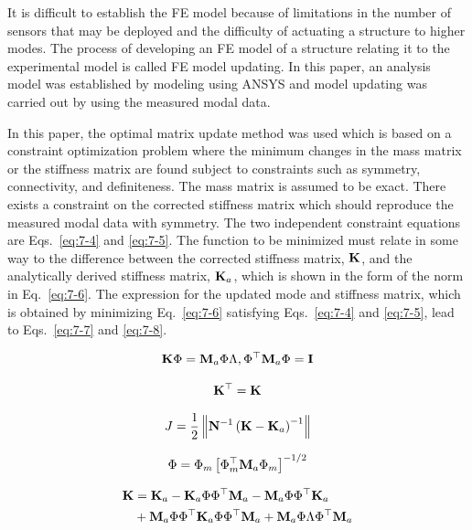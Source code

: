 It is difficult to establish the FE model because of limitations in the number of sensors that may be deployed and the difficulty of actuating a structure to higher modes. The process of developing an FE model of a structure relating it to the experimental model is called FE model updating\citep{bagchi2005updating}. In this paper, an analysis model was established by modeling using ANSYS and model updating was carried out by using the measured modal data.

In this paper, the optimal matrix update method was used which is based on a constraint optimization problem where the minimum changes in the mass matrix or the stiffness matrix are found subject to constraints such as symmetry, connectivity, and definiteness\citep{baruch1978optimization, baruch1979optimal}. The mass matrix is assumed to be exact. There exists a constraint on the corrected stiffness matrix which should reproduce the measured modal data with symmetry. The two independent constraint equations are Eqs.~\eqref{eq:7-4} and \eqref{eq:7-5}. The function to be minimized must relate in some way to the difference between the corrected stiffness matrix, $\mathbf{K}$, and the analytically derived stiffness matrix, $\mathbf{K}_{a}$, which is shown in the form of the norm in Eq.~\eqref{eq:7-6}. The expression for the updated mode and stiffness matrix, which is obtained by minimizing Eq.~\eqref{eq:7-6} satisfying Eqs.~\eqref{eq:7-4} and \eqref{eq:7-5}, lead to Eqs.~\eqref{eq:7-7} and \eqref{eq:7-8}\citep{baruch1979optimal, baruch1978optimization}.

\begin{equation}\label{eq:7-4}
\mathbf{K}\Phi = \mathbf{M}_{a}\Phi\Lambda, \Phi^{\top}\mathbf{M}_{a}\Phi = \mathbf{I}
\end{equation}

\begin{equation}\label{eq:7-5}
\mathbf{K}^{\top} = \mathbf{K}
\end{equation}

\begin{equation}\label{eq:7-6}
J=\frac{1}{2}\left\| \mathbf{N}^{-1}\left(\mathbf{K}-\mathbf{K}_{a}\right)^{-1}\right\|
\end{equation}

\begin{equation}\label{eq:7-7}
\Phi = \Phi_{m} \left[ \Phi_{m}^{\top}\mathbf{M}_{a}\Phi_{m}\right]^{-1/2}
\end{equation}

\begin{equation}\label{eq:7-8}
\begin{aligned}
\mathbf{K}&=\mathbf{K}_{a} - \mathbf{K}_{a}\Phi\Phi^{\top}\mathbf{M}_{a}-\mathbf{M}_{a}\Phi\Phi^{\top}\mathbf{K}_{a}\\
&+\mathbf{M}_{a}\Phi\Phi^{\top}\mathbf{K}_{a}\Phi\Phi^{\top}\mathbf{M}_{a} + \mathbf{M}_{a}\Phi\Lambda\Phi^{\top}\mathbf{M}_{a}
\end{aligned}
\end{equation}

